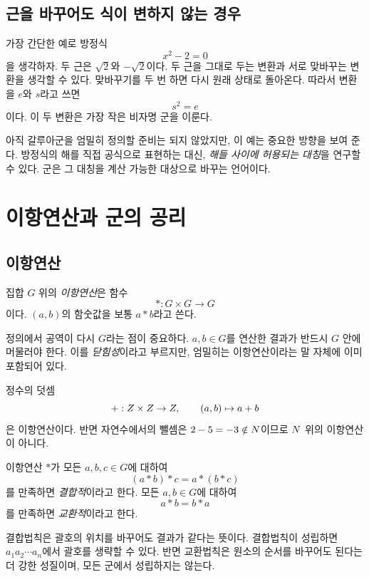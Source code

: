 \subsection{근을 바꾸어도 식이 변하지 않는 경우}

가장 간단한 예로 방정식
\[
  x^2-2=0
\]
을 생각하자. 두 근은 $\sqrt2$와 $-\sqrt2$이다. 두 근을 그대로 두는 변환과 서로 맞바꾸는 변환을 생각할 수 있다. 맞바꾸기를 두 번 하면 다시 원래 상태로 돌아온다. 따라서 변환을 $e$와 $s$라고 쓰면
\[
  s^2=e
\]
이다. 이 두 변환은 가장 작은 비자명 군을 이룬다.

아직 갈루아군을 엄밀히 정의할 준비는 되지 않았지만, 이 예는 중요한 방향을 보여 준다. 방정식의 해를 직접 공식으로 표현하는 대신, \emph{해들 사이에 허용되는 대칭}을 연구할 수 있다. 군은 그 대칭을 계산 가능한 대상으로 바꾸는 언어이다.

\section{이항연산과 군의 공리}
\label{sec:group-axioms}

\subsection{이항연산}

\begin{definition}[이항연산]
집합 $G$ 위의 \emph{이항연산}은 함수
\[
  \ast:G\times G\longrightarrow G
\]
이다. $(a,b)$의 함숫값을 보통 $a\ast b$라고 쓴다.
\end{definition}

정의에서 공역이 다시 $G$라는 점이 중요하다. $a,b\in G$를 연산한 결과가 반드시 $G$ 안에 머물러야 한다. 이를 \emph{닫힘성}이라고 부르지만, 엄밀히는 이항연산이라는 말 자체에 이미 포함되어 있다.

\begin{example}
정수의 덧셈
\[
  +:Z\times Z\to Z,\qquad (a,b)\mapsto a+b
\]
은 이항연산이다. 반면 자연수에서의 뺄셈은 $2-5=-3\notin N$이므로 $N$ 위의 이항연산이 아니다.
\end{example}

\begin{definition}
이항연산 $\ast$가 모든 $a,b,c\in G$에 대하여
\[
  (a\ast b)\ast c=a\ast(b\ast c)
\]
를 만족하면 \emph{결합적}이라고 한다. 모든 $a,b\in G$에 대하여
\[
  a\ast b=b\ast a
\]
를 만족하면 \emph{교환적}이라고 한다.
\end{definition}

결합법칙은 괄호의 위치를 바꾸어도 결과가 같다는 뜻이다. 결합법칙이 성립하면 $a_1a_2\cdots a_n$에서 괄호를 생략할 수 있다. 반면 교환법칙은 원소의 순서를 바꾸어도 된다는 더 강한 성질이며, 모든 군에서 성립하지는 않는다.

